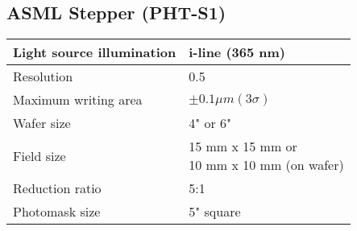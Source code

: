 \subsection{ASML Stepper (PHT-S1)}\label{lithography_machine}
\WaferClean\WaferSemiClean

\begin{minipage}[H]{\MachinePictureMiniPageWidth}
\end{minipage}\begin{minipage}[H]{\MachineTextMiniPageWidth}
	\begin{tabular}{|p{4cm}|p{6cm}|}
		\hline
		Light source illumination &
		i-line (365 nm) \\
		\hline
		Resolution &
		0.5\um \\
		\hline
		Maximum writing area &
		$\pm 0.1 \mu m (3 \sigma)$ \\
		\hline
		Wafer size &
		4" or 6" \\
		\hline
		Field size &
		\makecell[l]{
			15 mm x 15 mm or \\
			10 mm x 10 mm (on wafer)
		} \\
		\hline
		Reduction ratio &
		5:1 \\
		\hline
		Photomask size &
		5" square \\
		\hline
	\end{tabular}
\end{minipage}
